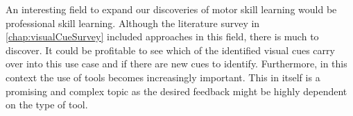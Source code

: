 An interesting field to expand our discoveries of motor skill learning would be professional skill learning.
Although the literature survey in \autoref{chap:visualCueSurvey} included approaches in this field, there is much to discover.
It could be profitable to see which of the identified visual cues carry over into this use case and if there are new cues to identify.
Furthermore, in this context the use of tools becomes increasingly important.
This in itself is a promising and complex topic as the desired feedback might be highly dependent on the type of tool.